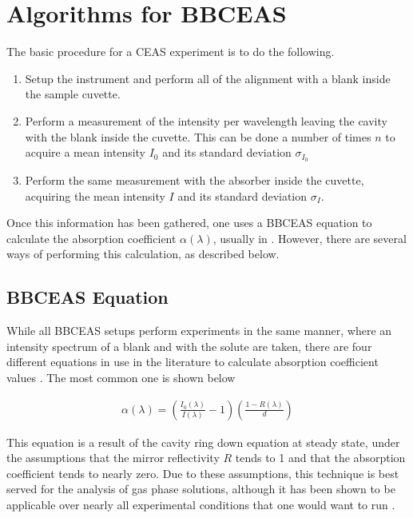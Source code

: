 \section{Algorithms for BBCEAS}

The basic procedure for a CEAS experiment is to do the following.

\begin{enumerate}
  \item Setup the instrument and perform all of the alignment with a blank
        inside the sample cuvette.
  \item Perform a measurement of the intensity per wavelength leaving the
        cavity with the blank inside the cuvette. This can be done a number of
        times $n$ to acquire a mean intensity $I_0$ and its standard deviation
        $\sigma_{I_0}$
  \item Perform the same measurement with the absorber inside the cuvette,
        acquiring the mean intensity $I$ and its standard deviation
        $\sigma_{I}$.
\end{enumerate}

Once this information has been gathered, one uses a \ac{BBCEAS} equation to
calculate the absorption coefficient $\alpha(\lambda)$, usually in \icm.
However, there are several ways of performing this calculation, as described
below.



\subsection{BBCEAS Equation}\label{subsec:bbceas_eq}


While all \ac{BBCEAS} setups perform experiments in the same manner, where an
intensity spectrum of a blank and with the solute are taken, there are four
different equations in use in the literature to calculate absorption
coefficient values \cite{Mazurenka:2005fh}. The most common one is shown below

  \begin{align}
    \alpha(\lambda) = \left(\frac{I_0(\lambda)}{I(\lambda)}-1\right)\left(\frac{1-R(\lambda)}{d}\right)\label{eq:ceas_std}
  \end{align}


This equation is a result of the cavity ring down equation at steady state,
under the assumptions that the mirror reflectivity $R$ tends to 1 and that the
absorption coefficient tends to nearly zero. Due to these assumptions, this
technique is best served for the analysis of gas phase solutions, although it
has been shown to be applicable over nearly all experimental conditions that
one would want to run \cite{Mazurenka:2005fh}.

